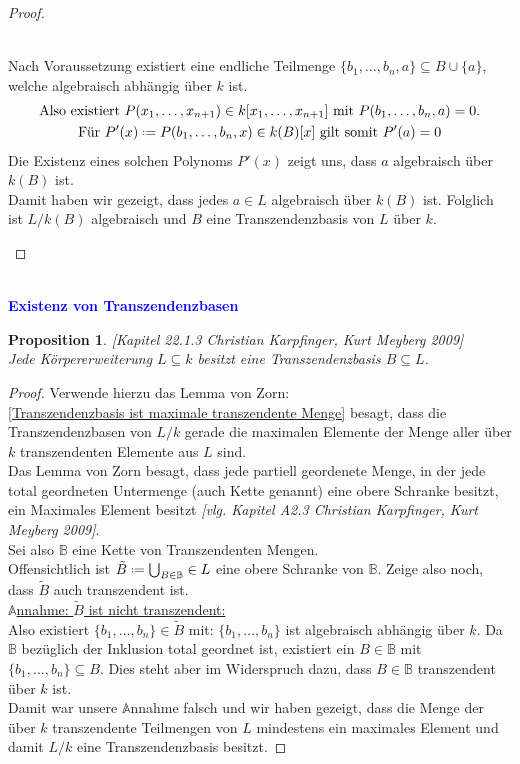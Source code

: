 \documentclass[10pt,a4paper]{report}
\newcommand{\Algebra}{Christian Karpfinger, Kurt Meyberg 2009}
\newcounter{Aussage}[chapter]
\newtheorem{prop}[Aussage]{Proposition}
\newcommand*{\defeq}{\mathrel{\vcenter{\baselineskip0.5ex \lineskiplimit0pt
                     \hbox{\scriptsize.}\hbox{\scriptsize.}}}%
                     =}
\begin{document}
\begin{proof}
\begin{itemize}
\ \\
Nach Voraussetzung existiert eine endliche Teilmenge $\lbrace b_1, \dots, b_n, a \rbrace \subseteq B \cup \lbrace a \rbrace$, welche algebraisch abhängig über $k$ ist.
\begin{gather*}
\text{Also existiert } P(x_1, \dots, x_{n+1}) \in k[x_1,\dots ,x_{n+1}] \text{ mit } P(b_1, \dots , b_n , a) = 0. \\
\text{Für } P'(x) \defeq P(b_1, \dots , b_n , x) \in k(B)[x] \text{ gilt somit } P'(a) = 0
\end{gather*}
Die Existenz eines solchen Polynoms $P'(x)$ zeigt uns, dass $a$ algebraisch über $k(B)$ ist.\\
Damit haben wir gezeigt, dass jedes $a \in L$ algebraisch über $k(B)$ ist. Folglich ist $L/k(B)$ algebraisch und $B$ eine Transzendenzbasis von $L$ über $k$. 
\end{itemize}
\end{proof}


\ \\
\textcolor{blue}{\textbf{Existenz von Transzendenzbasen}}
\begin{prop}\label{Existenz von Transzendenzbasen} 
\textit{[Kapitel 22.1.3 \Algebra}] \\
Jede Körpererweiterung $L \subseteq k$ besitzt eine Transzendenzbasis $B \subseteq L$.
\end{prop}
\begin{proof}
Verwende hierzu das Lemma von Zorn:\\
\cref{Transzendenzbasis ist maximale transzendente Menge} besagt, dass die Transzendenzbasen von $L/k$ gerade die maximalen Elemente der Menge aller über $k$ transzendenten Elemente aus $L$ sind.\\
Das Lemma von Zorn besagt, dass jede partiell geordenete Menge, in der jede total geordneten Untermenge (auch Kette genannt) eine obere Schranke besitzt, ein Maximales Element besitzt \textit{[vlg. Kapitel A2.3 \Algebra]}.\\
Sei also $\mathbb{B}$ eine Kette von Transzendenten Mengen.\\
Offensichtlich ist $\tilde{B} \defeq \bigcup_{B \in \mathbb{B}} \in L$ eine obere Schranke von $\mathbb{B}$. Zeige also noch, dass $\tilde{B}$ auch transzendent ist.\\
\underline{$\mathbb{A}$nnahme: $\tilde{B}$ ist nicht transzendent:}\\
Also existiert $\lbrace b_1,\dots,b_n \rbrace \in \tilde{B}$ mit: $\lbrace b_1,\dots,b_n \rbrace$ ist algebraisch abhängig über $k$. Da $\mathbb{B}$ bezüglich der Inklusion total geordnet ist, existiert ein $B \in \mathbb{B}$ mit $\lbrace b_1,\dots,b_n \rbrace \subseteq B$. Dies steht aber im Widerspruch dazu, dass $B \in \mathbb{B}$ transzendent über $k$ ist.\\
Damit war unsere $\mathbb{A}$nnahme falsch und wir haben gezeigt, dass die Menge der über $k$ transzendente Teilmengen von $L$ mindestens ein maximales Element und damit $L/k$ eine Transzendenzbasis besitzt.
\end{proof}
\end{document}
